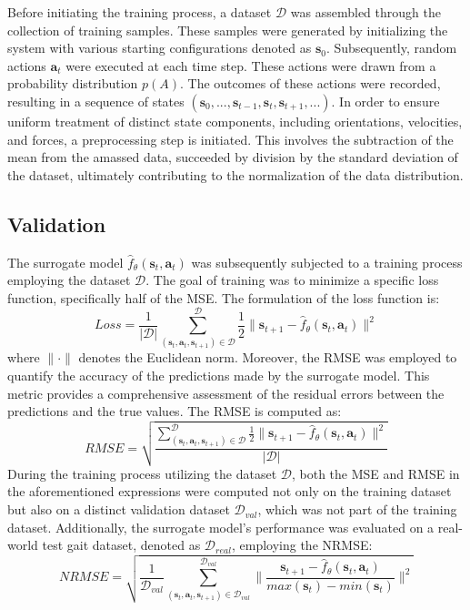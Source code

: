 Before initiating the training process, a dataset $\mathcal{D}$ was assembled through the collection of training samples. These samples were generated by initializing the system with various starting configurations denoted as $\mathbf{s}_0$. Subsequently, random actions $\mathbf{a}_t$ were executed at each time step. These actions were drawn from a probability distribution $p(A)$. The outcomes of these actions were recorded, resulting in a sequence of states $(\mathbf{s}_0, ..., \mathbf{s}_{t-1}, \mathbf{s}_t, \mathbf{s}_{t+1}, ...)$. In order to ensure uniform treatment of distinct state components, including orientations, velocities, and forces, a preprocessing step is initiated. This involves the subtraction of the mean from the amassed data, succeeded by division by the standard deviation of the dataset, ultimately contributing to the normalization of the data distribution.

\subsection{Validation}
The surrogate model $\hat{f}_\theta(\mathbf{s}_t, \mathbf{a}_t)$ was subsequently subjected to a training process employing the dataset $\mathcal{D}$. The goal of training was to minimize a specific loss function, specifically half of the \ac{MSE}. The formulation of the loss function is: 
\begin{equation}
    Loss = \frac{1}{|\mathcal{D}|}\sum_{(\mathbf{s}_t,\mathbf{a}_t, \mathbf{s}_{t+1}) \in \mathcal{D}}^\mathcal{D} \frac{1}{2}\lVert \mathbf{s}_{t+1}-\hat{f}_\theta(\mathbf{s}_t, \mathbf{a}_t)\rVert^2
\label{eq:loss}
\end{equation}
where $\lVert\cdot\rVert$ denotes the Euclidean norm. Moreover, the \ac{RMSE} was employed to quantify the accuracy of the predictions made by the surrogate model. This metric provides a comprehensive assessment of the residual errors between the predictions and the true values. The \ac{RMSE} is computed as: 
\begin{equation}
    RMSE = \sqrt{\frac{\sum_{(\mathbf{s}_t,\mathbf{a}_t, \mathbf{s}_{t+1}) \in \mathcal{D}}^\mathcal{D} \frac{1}{2}\lVert \mathbf{s}_{t+1}-\hat{f}_\theta(\mathbf{s}_t, \mathbf{a}_t)\rVert^2}{|\mathcal{D}|}}
    \label{eq:RMSE}
\end{equation}
During the training process utilizing the dataset $\mathcal{D}$, both the \ac{MSE} and \ac{RMSE} in the aforementioned expressions were computed not only on the training dataset but also on a distinct validation dataset $\mathcal{D}_{val}$, which was not part of the training dataset. Additionally, the surrogate model's performance was evaluated on a real-world test gait dataset, denoted as $\mathcal{D}_{real}$, employing the \ac{NRMSE}:
\begin{equation}
    NRMSE = \sqrt{\frac{1}{\mathcal{D}_{val}}\sum_{(\mathbf{s}_t,\mathbf{a}_t, \mathbf{s}_{t+1}) \in \mathcal{D}_{val}}^{\mathcal{D}_{val}} \lVert \frac{\mathbf{s}_{t+1}-\hat{f}_\theta(\mathbf{s}_t, \mathbf{a}_t)}{max(\mathbf{s}_t) - min(\mathbf{s}_t)}\rVert^2}
    \label{eq:NRMSE}
\end{equation}

